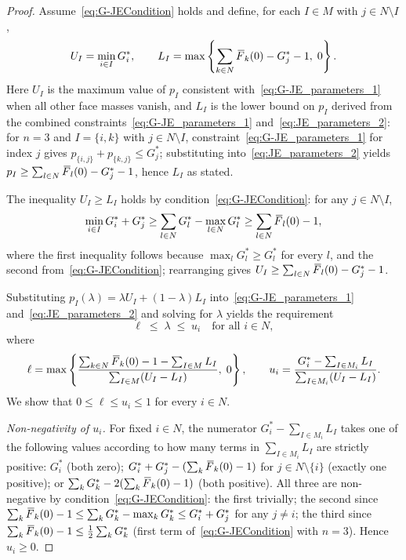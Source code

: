 \documentclass[10pt,a4paper]{amsart}
\newcommand{\F}{\,\overline{\kern-0.175em F\kern-0em}}
\newcommand{\I}{{I}}
\newcommand{\M}{{M}}
\newcommand{\N}{{N}}
\begin{document}
\begin{proof}
Assume~\eqref{eq:G-JECondition} holds and define, for each $\I\in\M$ with
$j\in\N\setminus\I$,
\[
U_\I=\min_{i\in\I}G_i^*,\qquad
L_\I=\max\left\{\sum_{k\in\N}\F_k(0)-G_j^*-1,\;0\right\}.
\]
Here $U_\I$ is the maximum value of $p_\I$ consistent
with~\eqref{eq:G-JE_parameters_1} when all other face masses vanish, and
$L_\I$ is the lower bound on $p_\I$ derived from the combined
constraints~\eqref{eq:G-JE_parameters_1} and~\eqref{eq:JE_parameters_2}: for
$n=3$ and $\I=\{i,k\}$ with $j\in\N\setminus\I$, constraint~\eqref{eq:G-JE_parameters_1}
for index $j$ gives $p_{\{i,j\}}+p_{\{k,j\}}\le G_j^*$; substituting
into~\eqref{eq:JE_parameters_2} yields $p_\I\ge\sum_{l\in\N}\F_l(0)-G_j^*-1$,
hence $L_\I$ as stated.

The inequality $U_\I\ge L_\I$ holds by condition~\eqref{eq:G-JECondition}: for
any $j\in\N\setminus\I$,
\[
\min_{i\in\I}G_i^*+G_j^*
\ge\sum_{l\in\N}G_l^*-\max_{l\in\N}G_l^*
\ge\sum_{l\in\N}\F_l(0)-1,
\]
where the first inequality follows because $\max_l G_l^*\ge G_l^*$ for every $l$,
and the second from~\eqref{eq:G-JECondition}; rearranging gives
$U_\I\ge\sum_{l\in\N}\F_l(0)-G_j^*-1$.

Substituting $p_\I(\lambda)=\lambda U_\I+(1-\lambda)L_\I$
into~\eqref{eq:G-JE_parameters_1} and~\eqref{eq:JE_parameters_2} and solving
for $\lambda$ yields the requirement
\begin{equation}
\label{eq:G-JE_trivariate_lambda}
\ell\;\le\;\lambda\;\le\;u_i\quad\text{for all }i\in\N,
\end{equation}
where
\[
\ell=\max\left\{
\frac{\sum_{k\in\N}\F_k(0)-1-\sum_{\I\in\M}L_{\I}}
     {\sum_{\I\in\M}(U_{\I}-L_{\I})},\;0\right\},
\qquad
u_i=\frac{G_i^*-\sum_{\I\in\M_i}L_{\I}}
         {\sum_{\I\in\M_i}(U_{\I}-L_{\I})}.
\]
We show that $0\le\ell\le u_i\le1$ for every $i\in\N$.

\smallskip
\noindent\textit{Non-negativity of $u_i$.}
For fixed $i\in\N$, the numerator $G_i^*-\sum_{\I\in\M_i}L_\I$ takes one of
the following values according to how many terms in $\sum_{\I\in\M_i}L_\I$ are
strictly positive: $G_i^*$ (both zero); $G_i^*+G_j^*-(\sum_k\F_k(0)-1)$ for
$j\in\N\setminus\{i\}$ (exactly one positive); or
$\sum_k G_k^*-2(\sum_k\F_k(0)-1)$ (both positive). All three are non-negative
by condition~\eqref{eq:G-JECondition}: the first trivially; the second since
$\sum_k\F_k(0)-1\le\sum_k G_k^*-\max_k G_k^*\le G_i^*+G_j^*$ for any
$j\ne i$; the third since $\sum_k\F_k(0)-1\le\tfrac{1}{2}\sum_k G_k^*$ (first
term of~\eqref{eq:G-JECondition} with $n=3$). Hence $u_i\ge0$.


\end{proof}
\end{document}
